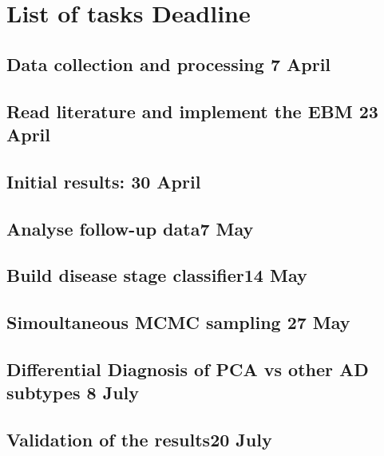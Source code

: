 \documentclass[12pt,a4paper,oneside]{report}
\begin{document}
\section*{List of tasks \hfill Deadline}

\renewcommand\arraystretch{4.4} %
\newcommand\taskHeader[1]{\Large{\textbf{#1}}}

\subsection*{\noindent Data collection and processing \hfill 7 April}

\subsection*{\noindent Read literature and implement the EBM \hfill 23 April}

\subsection*{\noindent Initial results: \hfill  30 April} 

\subsection*{\noindent Analyse follow-up data\hfill  7 May}

\subsection*{\noindent Build disease stage classifier\hfill  14 May}

\subsection*{\noindent Simoultaneous MCMC sampling \hfill 27 May}

\subsection*{\noindent Differential Diagnosis of PCA vs other AD subtypes \hfill 8 July}

\subsection*{\noindent Validation of the results\hfill  20 July}
\end{document}
